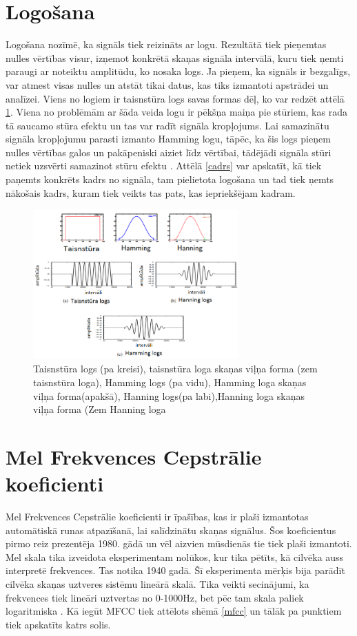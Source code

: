 \documentclass[12pt,paper=A4]{report}
\begin{document}
\section{Logošana}
Logošana nozīmē, ka signāls tiek reizināts ar logu. Rezultātā tiek pieņemtas nulles vērtības visur, izņemot konkrētā skaņas signāla intervālā, kuru tiek ņemti paraugi ar noteiktu amplitūdu, ko nosaka logs. Ja pieņem, ka signāls ir bezgalīgs, var atmest visas nulles un atstāt tikai datus, kas tiks izmantoti apstrādei un analīzei.
Viens no logiem ir taisnstūra logs savas formas dēļ, ko var redzēt attēlā \ref{windows}. Viena no problēmām ar šāda veida logu ir pēkšņa maiņa pie stūriem, kas rada tā saucamo stūra efektu un tas var radīt signāla kropļojums. Lai samazinātu signāla kropļojumu parasti izmanto Hamming logu, tāpēc, ka šis logs pieņem nulles vērtības galos un pakāpeniski aiziet līdz vērtībai, tādējādi signāla stūri netiek uzsvērti samazinot stūru efektu \cite{Windowing}.
Attēlā \ref{cadrs} var apskatīt, kā tiek paņemts konkrēts kadrs no signāla, tam pielietota logošana un tad tiek ņemts nākošais kadrs, kuram tiek veikts tas pats, kas iepriekšējam kadram.

\begin{figure}[h] \centering
\includegraphics[width=0.70\textwidth]{humming} 
\caption{Taisnstūra logs (pa kreisi), taisnstūra loga skaņas viļņa forma (zem taisnstūra loga), Hamming logs (pa vidu), Hamming loga skaņas viļņa forma(apakšā), Hanning logs(pa labi),Hanning loga skaņas viļņa forma (Zem Hanning loga \cite{dtw9}}  \label{windows} 
\end{figure}

\section{Mel Frekvences Cepstrālie koeficienti}
Mel Frekvences Cepstrālie koeficienti ir īpašības, kas ir plaši izmantotas automātiskā runas atpazīšanā, lai salīdzinātu skaņas signālus. Šos koeficientus pirmo reiz prezentēja 1980. gādā un vēl aizvien mūsdienās tie tiek plaši izmantoti. 
Mel skala tika izveidota eksperimentam nolūkos, kur tika pētīts, kā cilvēka auss interpretē frekvences. Tas notika 1940 gadā. Šī eksperimenta mērķis bija parādīt cilvēka skaņas uztveres sistēmu lineārā skalā. Tika veikti secinājumi, ka frekvences tiek lineāri uztvertas no 0-1000Hz, bet pēc tam skala paliek logaritmiska \cite{http://practicalcryptography.com/miscellaneous/machine-learning/guide-mel-frequency-cepstral-coefficients-mfccs/}.
Kā iegūt MFCC tiek attēlots shēmā \ref{mfcc} un tālāk pa punktiem tiek apskatīts katrs solis.
\end{document}

